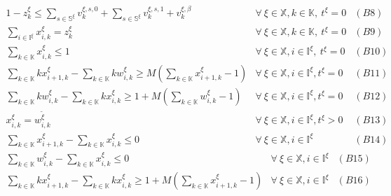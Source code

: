 \documentclass[]{interact}
\theoremstyle{plain}%
\theoremstyle{definition}
\theoremstyle{remark}
\begin{document}
\begin{eqnarray}
1 - z^{\xi}_{k} \le \sum_{s\in \mathbb{S}^{\xi}} v^{\xi,s,0}_k + \sum_{s\in \mathbb{S}^{\xi}} v^{\xi,s,1}_k+v^{\xi,\beta}_k&\forall\ \xi\in \mathbb{X},k\in \mathbb{K},\ t^{\xi} = 0&(B8)\nonumber\\
\sum_{i\in \mathbb{I}^{\xi}} x^{\xi}_{i,k} = z^{\xi}_k&\forall\ \xi\in \mathbb{X},k\in \mathbb{K},\ t^{\xi} = 0&(B9)\nonumber\\
\sum_{k\in \mathbb{K}} x^{\xi}_{i,k} \le 1& \forall\ \xi\in \mathbb{X},i\in \mathbb{I}^{\xi},\ t^{\xi} = 0&(B10)\nonumber\\
\sum_{k\in \mathbb{K}} kx^{\xi}_{i+1,k} - \sum_{k\in \mathbb{K}} kw^{\xi}_{i,k} \ge M(\sum_{k\in \mathbb{K}} x^{\xi}_{i+1,k}-1)&  \forall\ \xi\in \mathbb{X},i\in \mathbb{I}^{\xi}, t^{\xi} = 0&(B11)\nonumber\\
\sum_{k\in \mathbb{K}} kw^{\xi}_{i,k} - \sum_{k\in \mathbb{K}} kx^{\xi}_{i,k} \ge 1 +M(\sum_{k\in \mathbb{K}} w^{\xi}_{i,k}-1) &\forall\ \xi\in \mathbb{X}, i\in \mathbb{I}^{\xi}, t^{\xi} = 0&(B12) \nonumber\\
x^{\xi}_{i,k} = w^{\tilde{\xi}}_{i,k}&  \forall\ \xi\in \mathbb{X},i\in \mathbb{I}^{\xi}, t^{\xi} > 0&(B13)\nonumber\\
\sum_{k\in \mathbb{K}} x^{\xi}_{i+1,k} - \sum_{k\in \mathbb{K}} x^{\xi}_{i,k} \le 0&  \forall\ \xi\in \mathbb{X},i\in \mathbb{I}^{\xi}&(B14)\nonumber
\end{eqnarray}
\begin{eqnarray}
\sum_{k\in \mathbb{K}} w^{\xi}_{i,k}-\sum_{k\in \mathbb{K}} x^{\xi}_{i,k} \le 0&  \forall\ \xi\in \mathbb{X},i\in \mathbb{I}^{\xi}&(B15)\nonumber\\
\sum_{k\in \mathbb{K}} kx^{\xi}_{i+1,k} - \sum_{k\in \mathbb{K}} kx^{\xi}_{i,k} \ge 1+M(\sum_{k\in \mathbb{K}} x^{\xi}_{i+1,k}-1)&  \forall\ \xi\in \mathbb{X},i\in \mathbb{I}^{\xi}&(B16)\nonumber
\end{eqnarray}
\end{document}

